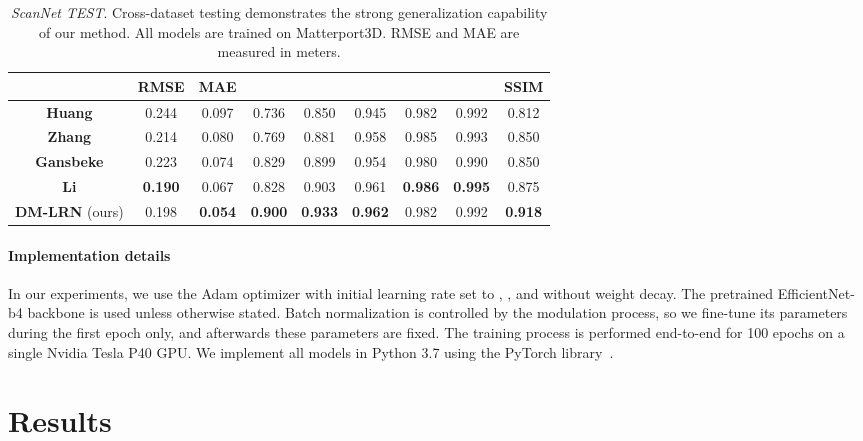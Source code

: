 \documentclass[final]{cvpr}
\begin{document}
    \begin{table*}[ht]
    \setlength{\tabcolsep}{9pt}
    \renewcommand{\arraystretch}{1.0}
    \centering
	\begin{tabular}{|c|c|c|c|c|c|c|c|c|}
	    \hline
	    & RMSE  & MAE  &   &   &   &   &   & SSIM  \\
		\hline
		\hline
		\textbf{Huang \etal \cite{Huang_2019}} & 0.244 & 0.097 & 0.736 & 0.850 & 0.945 & 0.982 & 0.992 & 0.812 \\
		\textbf{Zhang \etal \cite{DBLP:journals/corr/abs-1803-09326}} & 0.214 & 0.080 & 0.769 & 0.881 & 0.958 & 0.985 & 0.993 & 0.850 \\
		\textbf{Gansbeke} \etal \cite{wvangansbeke_depth_2019} & 0.223 & 0.074 & 0.829 & 0.899 & 0.954 & 0.980 & 0.990 & 0.850 \\
		\textbf{Li} \etal \cite{msg_chn} & \textbf{0.190} & 0.067 & 0.828 & 0.903 & 0.961 & \textbf{0.986} & \textbf{0.995} & 0.875 \\
		\hline
		\textbf{DM-LRN} (ours) & 0.198 & \textbf{0.054} & \textbf{0.900} & \textbf{0.933} & \textbf{0.962} & 0.982 & 0.992 & \textbf{0.918}\\
		\hline
	\end{tabular}
	\vspace{0.1cm}
	\caption{\emph{ScanNet TEST}. Cross-dataset testing demonstrates the strong generalization capability of our method. All models are trained on Matterport3D. RMSE and MAE are measured in meters.}
	\label{tab:scannet_test}
    \end{table*}

    \paragraph{Implementation details}
    In our experiments, we use the Adam \cite{adam} optimizer with initial learning rate set to , ,  and without weight decay. The pretrained EfficientNet-b4 \cite{EffitientNet} backbone is used unless otherwise stated. Batch normalization is controlled by the modulation process, so we fine-tune its parameters during the first epoch only, and afterwards these parameters are fixed. The training process is performed end-to-end for 100 epochs on a single Nvidia Tesla P40 GPU. We implement all models in Python 3.7 using the PyTorch library~\cite{NEURIPS2019_9015}.


\section{Results}\label{sec:Matterport3D}
\end{document}
